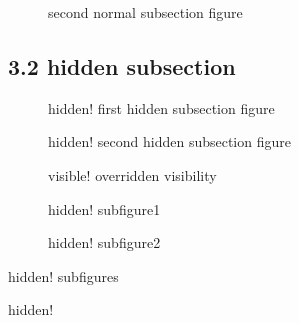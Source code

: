 \begin{figure}
\centering
{}
\caption{second normal subsection figure}\label{fig:fig_nss2}
\end{figure}

\subsection{3.2 hidden subsection}\label{hidden-subsection}

\begin{figure}
\centering
{}
\caption[]{hidden! first hidden subsection figure}\label{fig:fig_ss1}
\end{figure}

\begin{figure}
\centering
{}
\caption[]{hidden! second hidden subsection figure}\label{fig:fig_ss2}
\end{figure}

\begin{figure}
\centering
{}
\caption{visible! overridden visibility}\label{fig:fig_ss3}
\end{figure}

\begin{pandoccrossrefsubfigures}

\begin{subfigure}{0.495\linewidth}\caption{hidden!
subfigure1\label{fig:fig_sss1}}\end{subfigure}%
\begin{subfigure}{0.495\linewidth}\caption{hidden!
subfigure2\label{fig:fig_sss2}}\end{subfigure}%

\caption[]{hidden! subfigures}\label{fig:subfigs}

\end{pandoccrossrefsubfigures}

\begin{codelisting}

\caption[]{hidden!}\label{lst:listing}

\begin{Shaded}
\begin{Highlighting}[]
\OtherTok{=}  
\end{Highlighting}
\end{Shaded}

\end{codelisting}

